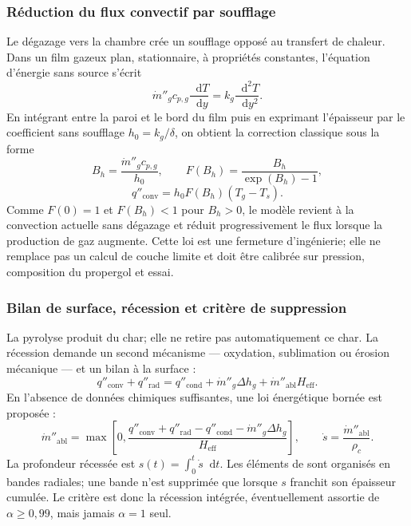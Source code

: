 \documentclass[oneside,openany]{amsdtx}
\newcommand{\dd}{\mathop{}\!\mathrm{d}}
\begin{document}
\subsubsection{Réduction du flux convectif par soufflage}

Le dégazage vers la chambre crée un soufflage opposé au transfert de chaleur.
Dans un film gazeux plan, stationnaire, à propriétés constantes, l'équation
d'énergie sans source s'écrit
\begin{equation}
  \dot m''_g c_{p,g}\frac{\dd T}{\dd y}
  =k_g\frac{\dd^2T}{\dd y^2}.
\end{equation}
En intégrant entre la paroi et le bord du film puis en exprimant l'épaisseur par
le coefficient sans soufflage \(h_0=k_g/\delta\), on obtient la correction
classique sous la forme
\begin{equation}
  B_h=\frac{\dot m''_g c_{p,g}}{h_0},\qquad
  F(B_h)=\frac{B_h}{\exp(B_h)-1},
\end{equation}
\begin{equation}
  \boxed{q''_\mathrm{conv}=h_0F(B_h)(T_g-T_s).}
  \label{eq:blowing}
\end{equation}
Comme \(F(0)=1\) et \(F(B_h)<1\) pour \(B_h>0\), le modèle revient à la
convection actuelle sans dégazage et réduit progressivement le flux lorsque la
production de gaz augmente. Cette loi est une fermeture d'ingénierie; elle ne
remplace pas un calcul de couche limite et doit être calibrée sur pression,
composition du propergol et essai.

\subsubsection{Bilan de surface, récession et critère de suppression}

La pyrolyse produit du char; elle ne retire pas automatiquement ce char. La
récession demande un second mécanisme --- oxydation, sublimation ou érosion
mécanique --- et un bilan à la surface :
\begin{equation}
  q''_\mathrm{conv}+q''_\mathrm{rad}
  =q''_\mathrm{cond}+\dot m''_g\Delta h_g
   +\dot m''_\mathrm{abl}H_\mathrm{eff}.
  \label{eq:surface-balance}
\end{equation}
En l'absence de données chimiques suffisantes, une loi énergétique bornée est
proposée :
\begin{equation}
  \dot m''_\mathrm{abl}=
  \max\left[0,
  \frac{q''_\mathrm{conv}+q''_\mathrm{rad}-q''_\mathrm{cond}
  -\dot m''_g\Delta h_g}{H_\mathrm{eff}}\right],
  \qquad
  \dot s=\frac{\dot m''_\mathrm{abl}}{\rho_c}.
  \label{eq:recession}
\end{equation}
La profondeur récessée est \(s(t)=\int_0^t\dot s\dd t\). Les éléments de
 sont organisés en bandes radiales; une bande n'est supprimée que
lorsque \(s\) franchit son épaisseur cumulée. Le critère est donc la récession
intégrée, éventuellement assortie de \(\alpha\ge0{,}99\), mais jamais
\(\alpha=1\) seul.
\end{document}
